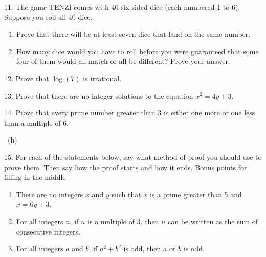 \documentclass[10pt,]{book}
\theoremstyle{plain}
\theoremstyle{definition}
\theoremstyle{definition}
\theoremstyle{definition}
\numberwithin{equation}{chapter}
\begin{document}
\begin{exerciselist}
\par\smallskip
\item[11.]\hypertarget{exercise-125}{}\hypertarget{p-2547}{}%
The game TENZI comes with 40 six-sided dice (each numbered 1 to 6). Suppose you roll all 40 dice. \leavevmode%
\begin{enumerate}[label=(\alph*)]
\item\hypertarget{li-545}{}Prove that there will be at least seven dice that land on the same number.%
\item\hypertarget{li-546}{}\hypertarget{p-2548}{}%
How many dice would you have to roll before you were guaranteed that some four of them would all match or all be different? Prove your answer.%
\end{enumerate}
%
\par\smallskip
\item[12.]\hypertarget{exercise-126}{}\hypertarget{p-2554}{}%
Prove that \(\log(7)\) is irrational.%
\par\smallskip
\item[13.]\hypertarget{exercise-127}{}\hypertarget{p-2559}{}%
Prove that there are no integer solutions to the equation \(x^2 = 4y + 3\).%
\par\smallskip
\item[14.]\hypertarget{exercise-128}{}\hypertarget{p-2560}{}%
Prove that every prime number greater than 3 is either one more or one less than a multiple of 6.%
\par\smallskip
~{\tiny (h)}\item[15.]\hypertarget{exercise-129}{}\hypertarget{p-2562}{}%
For each of the statements below, say what method of proof you should use to prove them. Then say how the proof starts and how it ends. Bonus points for filling in the middle.%
\par
\hypertarget{p-2563}{}%
\leavevmode%
\begin{enumerate}[label=(\alph*)]
\item\hypertarget{li-549}{}\hypertarget{p-2564}{}%
There are no integers \(x\) and \(y\) such that \(x\) is a prime greater than 5 and \(x = 6y + 3\).%
\item\hypertarget{li-550}{}\hypertarget{p-2565}{}%
For all integers \(n\), if \(n\) is a multiple of 3, then \(n\) can be written as the sum of consecutive integers.%
\item\hypertarget{li-551}{}\hypertarget{p-2566}{}%
For all integers \(a\) and \(b\), if \(a^2 + b^2\) is odd, then \(a\) or \(b\) is odd.%
\end{enumerate}

\end{exerciselist}
\end{document}
